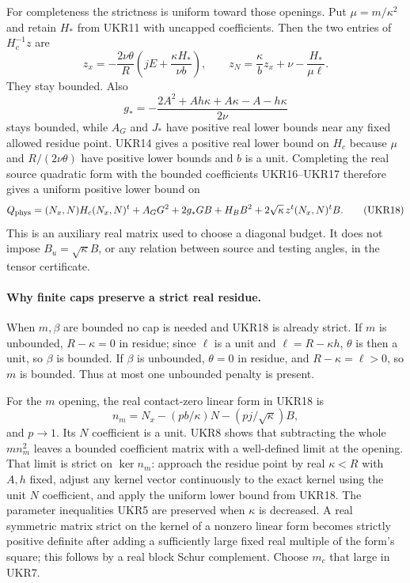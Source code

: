 For completeness the strictness is uniform toward those openings.
Put $\mu=m/\kappa^2$ and retain $H_*$ from UKR11 with uncapped
coefficients. Then the two entries of $H_c^{-1}z$ are
\[
 z_x=-\frac{2\nu\theta}{R}
                   \left(jE+\frac{\kappa H_*}{\nu b}\right),
 \qquad z_N=\frac\kappa b z_x+\nu-\frac{H_*}{\mu\ell}.
 \tag{UKR16}
\]
They stay bounded. Also
\[
 g_*=-\frac{2A^2+A h\kappa+A\kappa-A-h\kappa}{2\nu}
 \tag{UKR17}
\]
stays bounded, while $A_G$ and $J_*$ have positive real lower
bounds near any fixed allowed residue point. UKR14 gives a
positive real lower bound on $H_c$ because $\mu$ and
$R/(2\nu\theta)$ have positive lower bounds and $b$ is a unit.
Completing the real source quadratic form with the bounded
coefficients UKR16--UKR17 therefore gives a uniform positive
lower bound on
\[
 Q_{\rm phys}=(N_x,N)H_c(N_x,N)^t+A_GG^2+2g_*GB+H_BB^2
                         +2\sqrt\kappa\,z^t(N_x,N)^tB.
 \tag{UKR18}
\]
This is an auxiliary real matrix used to choose a diagonal budget.
It does not impose $B_u=\sqrt\kappa B$, or any relation between
source and testing angles, in the tensor certificate.

\paragraph{Why finite caps preserve a strict real residue.}
When $m,\beta$ are bounded no cap is needed and UKR18 is already
strict. If $m$ is unbounded, $R-\kappa=0$ in residue; since
$\ell$ is a unit and $\ell=R-\kappa h$, $\theta$ is then a unit,
so $\beta$ is bounded. If $\beta$ is unbounded, $\theta=0$ in
residue, and $R-\kappa=\ell>0$, so $m$ is bounded. Thus at
most one unbounded penalty is present.

For the $m$ opening, the real contact-zero linear form in UKR18 is
\[
 n_m=N_x-(pb/\kappa)N-(pj/\sqrt\kappa)B,
 \tag{UKR19}
\]
and $p\to1$. Its $N$ coefficient is a unit. UKR8 shows that
subtracting the whole $mn_m^2$ leaves a bounded coefficient
matrix with a well-defined limit at the opening. That limit is
strict on $\ker n_m$: approach the residue point by real
$\kappa<R$ with $A,h$ fixed, adjust any kernel vector continuously
to the exact kernel using the unit $N$ coefficient, and apply the
uniform lower bound from UKR18. The parameter inequalities UKR5
are preserved when $\kappa$ is decreased. A real symmetric matrix
strict on the kernel of a nonzero linear form becomes strictly
positive definite after adding a sufficiently large fixed real
multiple of the form's square; this follows by a real block Schur
complement. Choose $m_c$ that large in UKR7.

